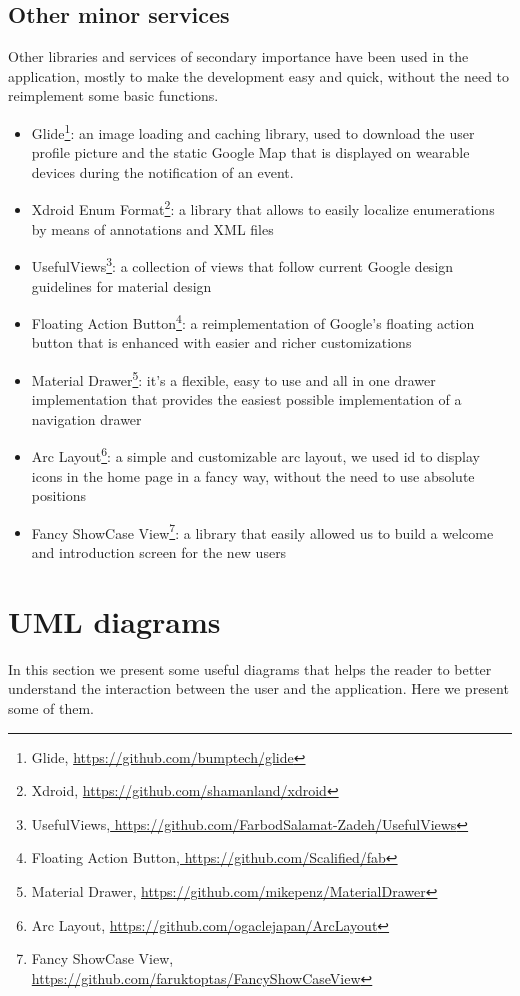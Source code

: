 \documentclass[a4paper]{scrreprt}
\begin{document}
\section{Other minor services}
\par Other libraries and services of secondary importance have been used in the application, mostly to make the development easy and quick, without the need to reimplement some basic functions.
\begin{itemize}
\item Glide\footnote{Glide, \url{https://github.com/bumptech/glide}}: an image loading and caching library, used to download the user profile picture and the static Google Map that is displayed on wearable devices during the notification of an event.
\item Xdroid Enum Format\footnote{Xdroid, \url{https://github.com/shamanland/xdroid}}: a library that allows to easily localize enumerations by means of annotations and XML files
\item UsefulViews\footnote{UsefulViews,\url{ https://github.com/FarbodSalamat-Zadeh/UsefulViews}}: a collection of views that follow current Google design guidelines for material design
\item Floating Action Button\footnote{Floating Action Button,\url{ https://github.com/Scalified/fab}}: a reimplementation of Google's floating action button that is enhanced with easier and richer customizations
\item Material Drawer\footnote{Material Drawer, \url{https://github.com/mikepenz/MaterialDrawer}}: it's a flexible, easy to use and all in one drawer implementation that provides the easiest possible implementation of a navigation drawer
\item Arc Layout\footnote{Arc Layout, \url{https://github.com/ogaclejapan/ArcLayout}}: a simple and customizable arc layout, we used id to display icons in the home page in a fancy way, without the need to use absolute positions
\item Fancy ShowCase View\footnote{Fancy ShowCase View, \url{https://github.com/faruktoptas/FancyShowCaseView}}: a library that easily allowed us to build a welcome and introduction screen for the new users
\end{itemize}


\chapter{UML diagrams}
In this section we present some useful diagrams that helps the reader to better understand the interaction between the user and the application. Here we present some of them.
\end{document}
